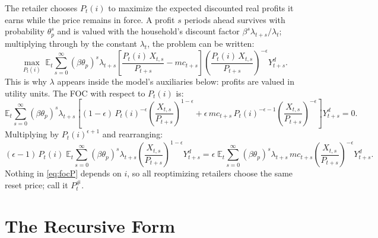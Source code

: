 \documentclass[11pt]{article}
\begin{document}
The retailer chooses $P_t(i)$ to maximize the expected discounted real profits it
earns while the price remains in force. A profit $s$ periods ahead survives with
probability $\theta_p^{s}$ and is valued with the household's discount factor
$\beta^{s}\lambda_{t+s}/\lambda_t$; multiplying through by the constant
$\lambda_t$, the problem can be written:
\begin{equation*}
    \max_{P_t(i)} \; \mathbb{E}_t \sum_{s=0}^{\infty}
    \left(\beta\theta_p\right)^{s} \lambda_{t+s}
    \left[\frac{P_t(i)\,X_{t,s}}{P_{t+s}} - mc_{t+s}\right]
    \left(\frac{P_t(i)\,X_{t,s}}{P_{t+s}}\right)^{-\epsilon} Y_{t+s}^{d}.
\end{equation*}
This is why $\lambda$ appears inside the model's auxiliaries below: profits are
valued in utility units. The FOC with respect to $P_t(i)$ is:
\begin{equation*}
    \mathbb{E}_t \sum_{s=0}^{\infty} \left(\beta\theta_p\right)^{s} \lambda_{t+s}
    \left[(1-\epsilon)\,P_t(i)^{-\epsilon}
    \left(\frac{X_{t,s}}{P_{t+s}}\right)^{1-\epsilon}
    + \epsilon\, mc_{t+s}\,P_t(i)^{-\epsilon-1}
    \left(\frac{X_{t,s}}{P_{t+s}}\right)^{-\epsilon}\right] Y_{t+s}^{d} = 0.
\end{equation*}
Multiplying by $P_t(i)^{\epsilon+1}$ and rearranging:
\begin{equation}\label{eq:focP}
    (\epsilon-1)\,P_t(i)\;\mathbb{E}_t \sum_{s=0}^{\infty}
    \left(\beta\theta_p\right)^{s} \lambda_{t+s}
    \left(\frac{X_{t,s}}{P_{t+s}}\right)^{1-\epsilon} Y_{t+s}^{d}
    = \epsilon\;\mathbb{E}_t \sum_{s=0}^{\infty}
    \left(\beta\theta_p\right)^{s} \lambda_{t+s}\, mc_{t+s}
    \left(\frac{X_{t,s}}{P_{t+s}}\right)^{-\epsilon} Y_{t+s}^{d}.
\end{equation}
Nothing in \eqref{eq:focP} depends on $i$, so all reoptimizing retailers choose the
same reset price; call it $P_t^{\#}$.

\section{The Recursive Form}
\end{document}
